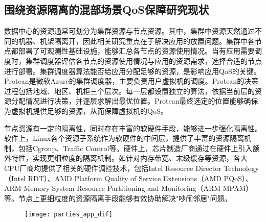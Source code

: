 \subsection{围绕资源隔离的混部场景QoS保障研究现状}


数据中心的资源通常可划分为集群资源与节点资源。其中，集群中资源天然通过不同的机器、机架隔离开，因此相关研究重点在于解决应用的放置问题。集群中各节点都部署了可观测性基础设施，能够汇总各节点的资源使用情况。当有应用需要调度时，集群调度器评估各节点的资源使用情况与应用的资源需求，选择合适的节点进行部署。集群调度器算法能否给应用分配足够的资源，是影响应用QoS的关键。Protean\citep{hadary2020protean}是微软Azure的集群调度器，主要负责用户虚拟机的调度。Protean的决策过程包括地域、地区、机柜三个层次。每一层都设置独立的算法，依据当前层的资源分配情况进行决策，并逐层求解出最优位置。Protean最终选定的位置能够确保为虚拟机提供足够的资源，从而保障虚拟机的QoS。

节点资源有一定的隔离性，同时存在丰富的软硬件手段，能够进一步强化隔离性。软件上，Linux各个资源子系统作为软硬件的中间层，提供了丰富的资源隔离机制，包括Cgroup、Traffic Control等。硬件上，芯片制造厂商通过在硬件上引入额外特性，实现更细粒度的隔离机制。如针对内存带宽、末级缓存等资源，各大CPU厂商均提供了相关的硬件调控技术，包括Intel Resource Director Technology（Intel RDT）\citep{guide2011intel}、AMD Platform Quality of Service Extensions（AMD PQoS）\citep{amdpqos}、ARM Memory System Resource Partitioning and Monitoring（ARM MPAM）\citep{armmpam}等。节点上更细粒度的资源隔离手段能够有效协助解决"吵闹邻居"问题\citep{xu2018dcat, maricq2018taming, rzadca2020autopilot, kwon2020dc}。

\begin{figure}[!htbp]
    \centering
    \texttt{[image: parties\_app\_dif]}
    \label{fig:parties_app_dif}
\end{figure}

